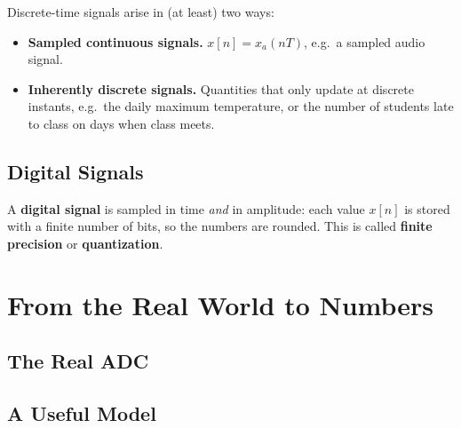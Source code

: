 \documentclass[handout_subfiles_root.tex]{subfiles}
\begin{document}
Discrete-time signals arise in (at least) two ways:
\begin{itemize}
  \item \textbf{Sampled continuous signals.} $x[n] = x_a(nT)$, e.g.\ a
  sampled audio signal.
  \item \textbf{Inherently discrete signals.} Quantities that only update at
  discrete instants, e.g.\ the daily maximum temperature, or the number of
  students late to class on days when class meets.
\end{itemize}

\subsection{Digital Signals}

\begin{defbox}[title={Definition (Digital Signal)}]
A \textbf{digital signal} is sampled in time \emph{and} in amplitude: each
value $x[n]$ is stored with a finite number of bits, so the numbers are
rounded. This is called \textbf{finite precision} or \textbf{quantization}.
\end{defbox}

\section{From the Real World to Numbers}

\subsection{The Real ADC}

\begin{center}
\end{center}

\subsection{A Useful Model}
\end{document}
